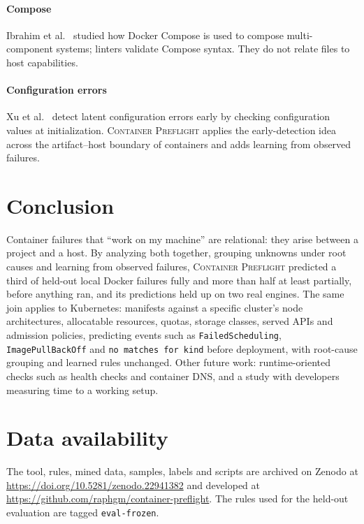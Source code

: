 \documentclass[preprint,12pt]{elsarticle}
\newcommand{\tool}{\textsc{Container Preflight}}
\begin{document}
\paragraph{Compose} Ibrahim et al.~\cite{ibrahim2021compose} studied how Docker Compose is used to compose multi-component systems; linters validate Compose syntax. They do not relate files to host capabilities.

\paragraph{Configuration errors} Xu et al.~\cite{xu2016pcheck} detect latent configuration errors early by checking configuration values at initialization. \tool{} applies the early-detection idea across the artifact--host boundary of containers and adds learning from observed failures.

\section{Conclusion}
\label{sec:conclusion}

Container failures that ``work on my machine'' are relational: they arise between a project and a host. By analyzing both together, grouping unknowns under root causes and learning from observed failures, \tool{} predicted a third of held-out local Docker failures fully and more than half at least partially, before anything ran, and its predictions held up on two real engines. The same join applies to Kubernetes: manifests against a specific cluster's node architectures, allocatable resources, quotas, storage classes, served APIs and admission policies, predicting events such as \texttt{FailedScheduling}, \texttt{ImagePullBackOff} and \texttt{no matches for kind} before deployment, with root-cause grouping and learned rules unchanged. Other future work: runtime-oriented checks such as health checks and container DNS, and a study with developers measuring time to a working setup.

\section*{Data availability}
The tool, rules, mined data, samples, labels and scripts are archived on Zenodo at \url{https://doi.org/10.5281/zenodo.22941382} and developed at \url{https://github.com/raphgm/container-preflight}. The rules used for the held-out evaluation are tagged \texttt{eval-frozen}.



\end{document}
